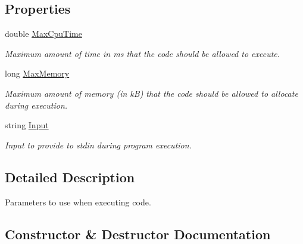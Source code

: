 \subsection*{Properties}
\begin{DoxyCompactItemize}
\item 
double \mbox{\hyperlink{class_code_a_friend_1_1_data_model_1_1_execution_parameters_a3a919b6815a5945ecc04a4d388a2962c}{Max\+Cpu\+Time}}
\begin{DoxyCompactList}\small\item\em Maximum amount of time in ms that the code should be allowed to execute. \end{DoxyCompactList}\item 
long \mbox{\hyperlink{class_code_a_friend_1_1_data_model_1_1_execution_parameters_a8fa68ab9aabe8993245a26541d2256c6}{Max\+Memory}}
\begin{DoxyCompactList}\small\item\em Maximum amount of memory (in kB) that the code should be allowed to allocate during execution. \end{DoxyCompactList}\item 
string \mbox{\hyperlink{class_code_a_friend_1_1_data_model_1_1_execution_parameters_a7d693e2b7e6696606e29a083792c4cc6}{Input}}
\begin{DoxyCompactList}\small\item\em Input to provide to stdin during program execution. \end{DoxyCompactList}\end{DoxyCompactItemize}


\subsection{Detailed Description}
Parameters to use when executing code. 



\subsection{Constructor \& Destructor Documentation}
\mbox{\label{class_code_a_friend_1_1_data_model_1_1_execution_parameters_ad64d2dbe0d229005a3ca8ec620525cdf}} 
